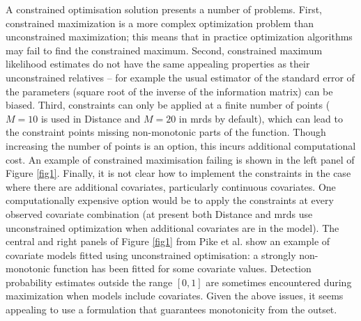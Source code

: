 \documentclass[10pt]{article}
\begin{document}
A constrained optimisation solution presents a number of problems. First, constrained maximization is a more complex optimization problem than unconstrained maximization; this means that in practice optimization algorithms may fail to find the constrained maximum.  Second, constrained maximum likelihood estimates do not have the same appealing properties as their unconstrained relatives -- for example the usual estimator of the standard error of the parameters (square root of the inverse of the information matrix) can be biased.  Third, constraints can only be applied at a finite number of points ($M=10$ is used in Distance and $M=20$ in mrds by default), which can lead to the constraint points missing non-monotonic parts of the function. Though increasing the number of points is an option, this incurs additional computational cost. An example of constrained maximisation failing is shown in the left panel of Figure \ref{fig1}. Finally, it is not clear how to implement the constraints in the case where there are additional covariates, particularly continuous covariates. One computationally expensive option would be to apply the constraints at every observed covariate combination (at present both Distance and mrds use unconstrained optimization when additional covariates are in the model). The central and right panels of Figure \ref{fig1} from Pike et al. \cite{Pike:2003ug} show an example of covariate models fitted using unconstrained optimisation: a strongly non-monotonic function has been fitted for some covariate values. Detection probability estimates outside the range $[0,1]$ are sometimes encountered during maximization when models include covariates. Given the above issues, it seems appealing to use a formulation that guarantees monotonicity from the outset.
\end{document}
